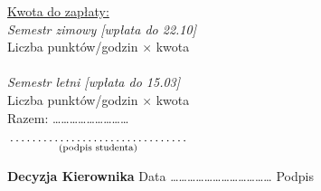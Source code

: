 \documentclass[a4paper,11pt]{article}
\newcommand{\fillField}[2]{
    $\underset{\text{#1}}{\parbox[t]{#2}{\dotfill}}$
}
\begin{document}
\noindent
\underline{Kwota do zapłaty:}\\
\textit{Semestr zimowy [wpłata do 22.10]}\\
Liczba punktów/godzin \dotfill $\times$ kwota \dotfill \\\\
\textit{Semestr letni [wpłata do 15.03]}\\
Liczba punktów/godzin \dotfill $\times$ kwota \dotfill \\

\hspace{\fill} Razem: \ldots\ldots\ldots\ldots\ldots\ldots\ldots\ldots\ldots \hspace{2.0cm}


\vskip 0.6cm

\hspace{\fill} \fillField{(podpis studenta)}{5cm} \hspace{2.0cm}
\vskip 1.0cm

\noindent
\textbf{Decyzja Kierownika} \dotfill
\vskip 0.5cm
\noindent
Data ……………………………… Podpis \dotfill
\end{document}
